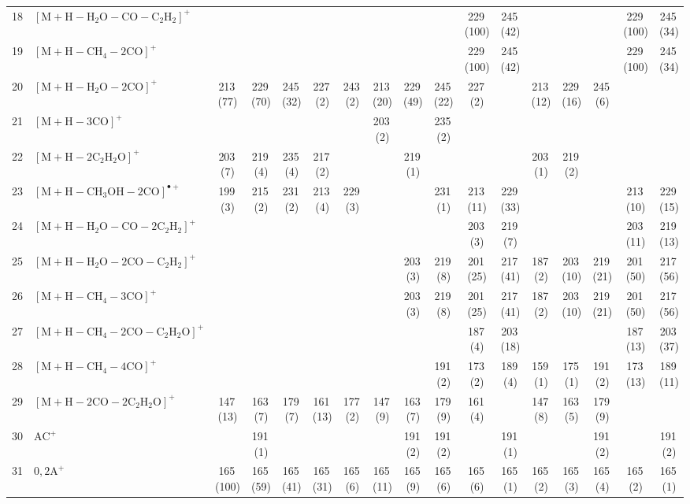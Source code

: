 \documentclass[]{article}
\begin{document}
\begin{table}
{\begin{tabular}{ll|ccccc|ccccc|ccccc}
  18 & $\mathrm{[M{+}H{-}H_{2}O{-}CO{-}C_{2}H_{2}]^+}$ &  &  &  &  &  &  &  &  & 229\,(100) & 245\,(42) &  &  &  & 229\,(100) & 245\,(34) \\ 
  19 & $\mathrm{[M{+}H{-}CH_{4}{-}2CO]^+}$ &  &  &  &  &  &  &  &  & 229\,(100) & 245\,(42) &  &  &  & 229\,(100) & 245\,(34) \\ 
  20 & $\mathrm{[M{+}H{-}H_{2}O{-}2CO]^+}$ & 213\,(77) & 229\,(70) & 245\,(32) & 227\,(2) & 243\,(2) & 213\,(20) & 229\,(49) & 245\,(22) & 227\,(2) &  & 213\,(12) & 229\,(16) & 245\,(6) &  &  \\ 
  21 & $\mathrm{[M{+}H{-}3CO]^+}$ &  &  &  &  &  & 203\,(2) &  & 235\,(2) &  &  &  &  &  &  &  \\ 
  22 & $\mathrm{[M{+}H{-}2C_{2}H_{2}O]^+}$ & 203\,(7) & 219\,(4) & 235\,(4) & 217\,(2) &  &  & 219\,(1) &  &  &  & 203\,(1) & 219\,(2) &  &  &  \\ 
  23 & $\mathrm{[M{+}H{-}CH_{3}OH{-}2CO]^{\bullet+}}$ & 199\,(3) & 215\,(2) & 231\,(2) & 213\,(4) & 229\,(3) &  &  & 231\,(1) & 213\,(11) & 229\,(33) &  &  &  & 213\,(10) & 229\,(15) \\ 
  24 & $\mathrm{[M{+}H{-}H_{2}O{-}CO{-}2C_{2}H_{2}]^+}$ &  &  &  &  &  &  &  &  & 203\,(3) & 219\,(7) &  &  &  & 203\,(11) & 219\,(13) \\ 
  25 & $\mathrm{[M{+}H{-}H_{2}O{-}2CO{-}C_{2}H_{2}]^+}$ &  &  &  &  &  &  & 203\,(3) & 219\,(8) & 201\,(25) & 217\,(41) & 187\,(2) & 203\,(10) & 219\,(21) & 201\,(50) & 217\,(56) \\ 
  26 & $\mathrm{[M{+}H{-}CH_{4}{-}3CO]^+}$ &  &  &  &  &  &  & 203\,(3) & 219\,(8) & 201\,(25) & 217\,(41) & 187\,(2) & 203\,(10) & 219\,(21) & 201\,(50) & 217\,(56) \\ 
  27 & $\mathrm{[M{+}H{-}CH_{4}{-}2CO{-}C_{2}H_{2}O]^+}$ &  &  &  &  &  &  &  &  & 187\,(4) & 203\,(18) &  &  &  & 187\,(13) & 203\,(37) \\ 
  28 & $\mathrm{[M{+}H{-}CH_{4}{-}4CO]^+}$ &  &  &  &  &  &  &  & 191\,(2) & 173\,(2) & 189\,(4) & 159\,(1) & 175\,(1) & 191\,(2) & 173\,(13) & 189\,(11) \\ 
  29 & $\mathrm{[M{+}H{-}2CO{-}2C_{2}H_{2}O]^+}$ & 147\,(13) & 163\,(7) & 179\,(7) & 161\,(13) & 177\,(2) & 147\,(9) & 163\,(7) & 179\,(9) & 161\,(4) &  & 147\,(8) & 163\,(5) & 179\,(9) &  &  \\ 
  30 & $\mathrm{AC^+}$ &  & 191\,(1) &  &  &  &  & 191\,(2) & 191\,(2) &  & 191\,(1) &  &  & 191\,(2) &  & 191\,(2) \\ 
  31 & $\mathrm{0{,}2A^+}$ & 165\,(100) & 165\,(59) & 165\,(41) & 165\,(31) & 165\,(6) & 165\,(11) & 165\,(9) & 165\,(6) & 165\,(6) & 165\,(1) & 165\,(2) & 165\,(3) & 165\,(4) & 165\,(2) & 165\,(1) \\ 

\end{tabular}}
\end{table}
\end{document}
